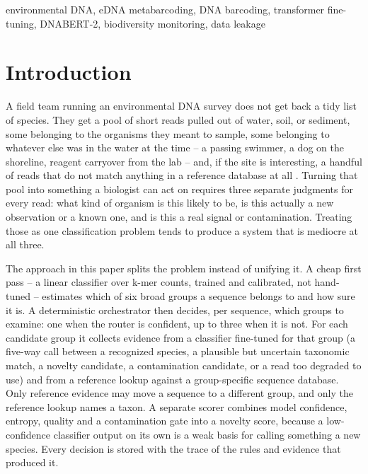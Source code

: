 \documentclass[conference]{IEEEtran}
\begin{document}
\begin{IEEEkeywords}
environmental DNA, eDNA metabarcoding, DNA barcoding, transformer fine-tuning, DNABERT-2, biodiversity monitoring, data leakage
\end{IEEEkeywords}

\section{Introduction}

A field team running an environmental DNA survey does not get back a tidy list of species. They get a pool of short reads pulled out of water, soil, or sediment, some belonging to the organisms they meant to sample, some belonging to whatever else was in the water at the time -- a passing swimmer, a dog on the shoreline, reagent carryover from the lab -- and, if the site is interesting, a handful of reads that do not match anything in a reference database at all \cite{deiner2017edna,ficetola2008edna,taberlet2012edna}. Turning that pool into something a biologist can act on requires three separate judgments for every read: what kind of organism is this likely to be, is this actually a new observation or a known one, and is this a real signal or contamination. Treating those as one classification problem tends to produce a system that is mediocre at all three.

The approach in this paper splits the problem instead of unifying it. A cheap first pass -- a linear classifier over k-mer counts, trained and calibrated, not hand-tuned -- estimates which of six broad groups a sequence belongs to and how sure it is. A deterministic orchestrator then decides, per sequence, which groups to examine: one when the router is confident, up to three when it is not. For each candidate group it collects evidence from a classifier fine-tuned for that group (a five-way call between a recognized species, a plausible but uncertain taxonomic match, a novelty candidate, a contamination candidate, or a read too degraded to use) and from a reference lookup against a group-specific sequence database. Only reference evidence may move a sequence to a different group, and only the reference lookup names a taxon. A separate scorer combines model confidence, entropy, quality and a contamination gate into a novelty score, because a low-confidence classifier output on its own is a weak basis for calling something a new species. Every decision is stored with the trace of the rules and evidence that produced it.
\end{document}
